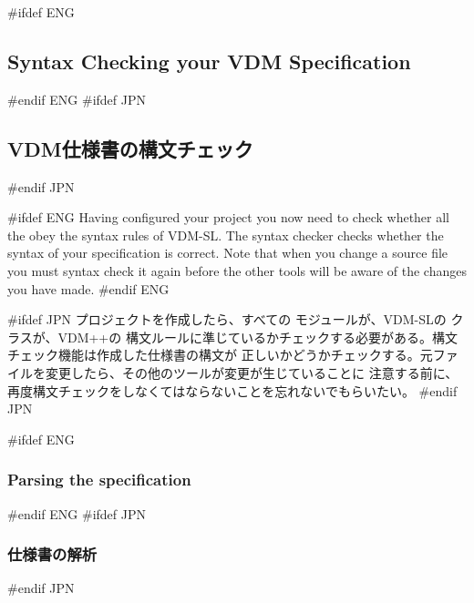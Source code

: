 \documentclass[\pformat,12pt]{article}
\newcommand{\vdmslpp}{VDM-SL}
\newcommand{\vdmslpp}{VDM++}
\begin{document}
#ifdef ENG
\subsection{Syntax Checking your VDM Specification}
#endif ENG
#ifdef JPN
\subsection{VDM仕様書の構文チェック} 
#endif JPN

#ifdef ENG
Having configured your project you now need to check whether all the
 obey the syntax rules
of \vdmslpp.  The syntax checker checks whether the syntax of your
specification is correct. Note that when you change a source file you
must syntax check it again before the other tools will be aware of the
changes you have made.
#endif ENG

#ifdef JPN
プロジェクトを作成したら、すべての
{
モジュールが、VDM-SLの
}
{
クラスが、VDM++の
}
構文ルールに準じているかチェックする必要がある。構文チェック機能は作成した仕様書の構文が
正しいかどうかチェックする。元ファイルを変更したら、その他のツールが変更が生じていることに
注意する前に、再度構文チェックをしなくてはならないことを忘れないでもらいたい。
#endif JPN

#ifdef ENG
\subsubsection{Parsing the specification}
#endif ENG
#ifdef JPN
\subsubsection{仕様書の解析}
#endif JPN
\end{document}
